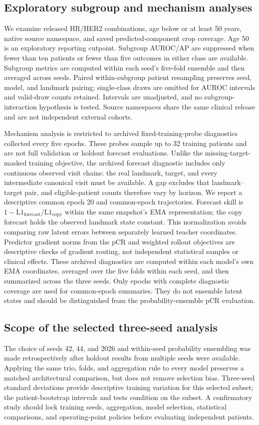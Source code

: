 \subsection{Exploratory subgroup and mechanism analyses}
We examine released HR/HER2 combinations, age below or at least 50 years, native source namespace, and saved predicted-component crop coverage. Age 50 is an exploratory reporting cutpoint. Subgroup AUROC/AP are suppressed when fewer than ten patients or fewer than five outcomes in either class are available. Subgroup metrics are computed within each seed's five-fold ensemble and then averaged across seeds. Paired within-subgroup patient resampling preserves seed, model, and landmark pairing; single-class draws are omitted for AUROC intervals and valid-draw counts retained. Intervals are unadjusted, and no subgroup-interaction hypothesis is tested. Source namespaces share the same clinical release and are not independent external cohorts.

Mechanism analysis is restricted to archived fixed-training-probe diagnostics collected every five epochs. These probes sample up to 32 training patients and are not full validation or holdout forecast evaluations. Unlike the missing-target-masked training objective, the archived forecast diagnostic includes only continuous observed visit chains: the real landmark, target, and every intermediate canonical visit must be available. A gap excludes that landmark--target pair, and eligible-patient counts therefore vary by horizon. We report a descriptive common epoch 20 and common-epoch trajectories. Forecast skill is $1-\mathrm{L1}_{\mathrm{forecast}}/\mathrm{L1}_{\mathrm{copy}}$ within the same snapshot's EMA representation; the copy forecast holds the observed landmark state constant. This normalization avoids comparing raw latent errors between separately learned teacher coordinates. Predictor gradient norms from the pCR and weighted rollout objectives are descriptive checks of gradient routing, not independent statistical samples or clinical effects. These archived diagnostics are computed within each model's own EMA coordinates, averaged over the five folds within each seed, and then summarized across the three seeds. Only epochs with complete diagnostic coverage are used for common-epoch summaries. They do not ensemble latent states and should be distinguished from the probability-ensemble pCR evaluation.

\subsection{Scope of the selected three-seed analysis}
The choice of seeds 42, 44, and 2026 and within-seed probability ensembling was made retrospectively after holdout results from multiple seeds were available. Applying the same trio, folds, and aggregation rule to every model preserves a matched architectural comparison, but does not remove selection bias. Three-seed standard deviations provide descriptive training variation for this selected subset; the patient-bootstrap intervals and tests condition on the subset. A confirmatory study should lock training seeds, aggregation, model selection, statistical comparisons, and operating-point policies before evaluating independent patients.
